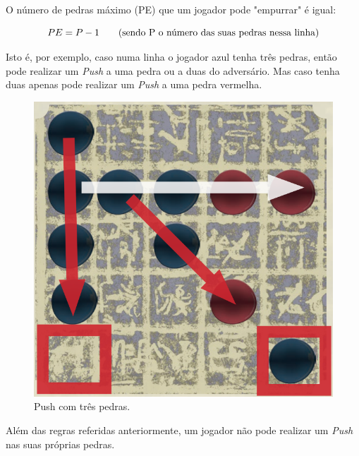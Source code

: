 \documentclass[a4paper]{article}
\begin{document}
O número de pedras máximo (PE) que um jogador pode "empurrar" é igual:

\begin{equation}
PE = P - 1 \text{\hspace{7mm}(sendo P o número das suas pedras nessa linha)}
\end{equation}

Isto é, por exemplo, caso numa linha o jogador azul tenha três pedras, então pode realizar um  \textit{Push} a uma pedra ou a duas do adversário. Mas caso tenha duas apenas pode realizar um  \textit{Push} a uma pedra vermelha.

\begin{figure}[!htb]
\centering
\includegraphics[scale=0.3]{push2.png}
\caption{Push com três pedras.}
\end{figure}

Além das regras referidas anteriormente, um jogador não pode realizar um  \textit{Push} nas suas próprias pedras.
\end{document}

